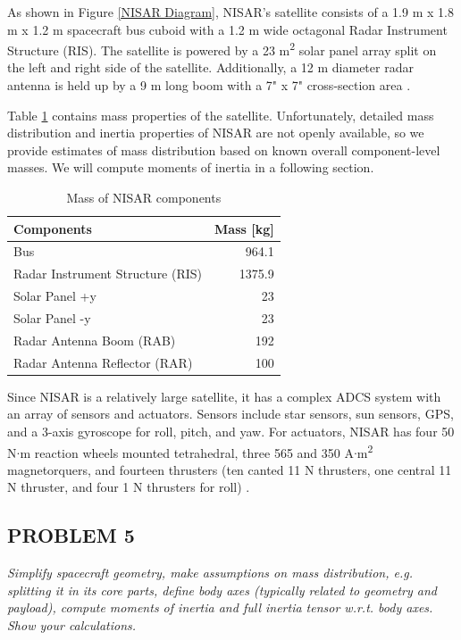 As shown in Figure \ref{NISAR Diagram}, NISAR's satellite consists of a 1.9 m x 1.8 m x 1.2 m spacecraft bus cuboid with a 1.2 m wide octagonal Radar Instrument Structure (RIS). The satellite is powered by a 23 m\textsuperscript{2} solar panel array split on the left and right side of the satellite. Additionally, a 12 m diameter radar antenna is held up by a 9 m long boom with a 7" x 7" cross-section area \cite{NISARMission}.

Table \ref{tab:mass} contains mass properties of the satellite. Unfortunately, detailed mass distribution and inertia properties of NISAR are not openly available, so we provide estimates of mass distribution based on known overall component-level masses. We will compute moments of inertia in a following section.

\begin{longtable}{l|r}
\caption{Mass of NISAR components}
\label{tab:mass}\\
\textbf{Components}              & \multicolumn{1}{l}{\textbf{Mass {[}kg{]}}} \\ \hline
\endfirsthead
%
\endhead
%
Bus                              & 964.1                                      \\
Radar Instrument Structure (RIS) & 1375.9                                     \\
Solar Panel +y                   & 23                                         \\
Solar Panel -y                   & 23                                         \\
Radar Antenna Boom (RAB)         & 192                                        \\
Radar Antenna Reflector (RAR)    & 100                                       
\end{longtable}

Since NISAR is a relatively large satellite, it has a complex ADCS system with an array of sensors and actuators. Sensors include star sensors, sun sensors, GPS, and a 3-axis gyroscope for roll, pitch, and yaw. For actuators, NISAR has four 50 N$\cdot$m reaction wheels mounted tetrahedral, three 565 and 350 A$\cdot$m\textsuperscript{2} magnetorquers, and fourteen thrusters (ten canted 11 N thrusters, one central 11 N thruster, and four 1 N thrusters for roll) \cite{NISARMission}.

\subsection{PROBLEM 5}
\textit{Simplify spacecraft geometry, make assumptions on mass distribution, e.g. splitting it in its core parts, define body axes (typically related to geometry and payload), compute moments of inertia and full inertia tensor w.r.t. body axes. Show your calculations.}

